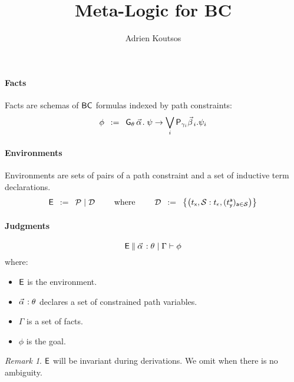 \documentclass[a4paper]{article}
\theoremstyle{remark}
\newtheorem{remark}{Remark}
\begin{document}
\title{Meta-Logic for BC}


\author{Adrien Koutsos}

\maketitle

\paragraph{Facts}
Facts are schemas of $\textsf{BC}$ formulas indexed by path constraints:
\[
  \phi \mdef
  \cforall_\theta\, \valpha.\;
  \psi
  \ra
  \bigvee_{i}
  \cexists_\gammai \vbetai. \psi_i
\]

\paragraph{Environments}
Environments are sets of pairs of a path constraint and a set of inductive term declarations.
\[
  \textsf{E} \;\;\mathbin{:=}\;\;
  \mathcal{P} \mid
  \mathcal{D}
  \qquad
  \text{ where }
  \qquad
  \mathcal{D} \;\;\mathbin{:=}\;\;
  \left\{
    \left(t_{\textsf{x}} , \mathcal{S} : t_\epsilon,(t_{\textsf{y}}^{\textsf{a}})_{{\textsf{a}} \in \mathcal{S}}\right)
  \right\}
\]

\paragraph{Judgments}
\[
  \ejudge{\env}{\facts{\valpha}{\theta}{\Gamma}}{\phi}
\]
where:
\begin{itemize}
\item $\textsf{E}$ is the environment.
\item $\pvtype{\valpha}{\theta}$ declares a set of constrained path variables.
\item $\Gamma$ is a set of facts.
\item $\phi$ is the goal.
\end{itemize}

\begin{remark}
  $\textsf{E}$ will be invariant during derivations. We omit when there is no ambiguity.
\end{remark}
\end{document}
